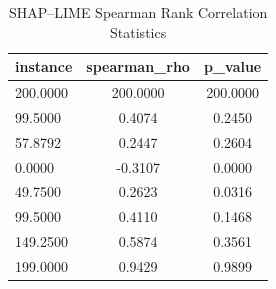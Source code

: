 \begin{table}
\centering
\caption{SHAP–LIME Spearman Rank Correlation Statistics}
\label{tab:agreement}
\begin{tabular}{lcc}
\toprule
instance & spearman_rho & p_value \\
\midrule
200.0000 & 200.0000 & 200.0000 \\
99.5000 & 0.4074 & 0.2450 \\
57.8792 & 0.2447 & 0.2604 \\
0.0000 & -0.3107 & 0.0000 \\
49.7500 & 0.2623 & 0.0316 \\
99.5000 & 0.4110 & 0.1468 \\
149.2500 & 0.5874 & 0.3561 \\
199.0000 & 0.9429 & 0.9899 \\
\bottomrule
\end{tabular}
\end{table}
